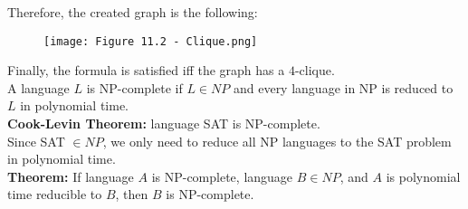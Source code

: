 \documentclass{article}
\begin{document}
Therefore, the created graph is the following:
\begin{figure}[H]
    \centering
    \texttt{[image: Figure 11.2 - Clique.png]}
\end{figure}
Finally, the formula is satisfied iff the graph has a $4$-clique.
\vspace{0.2cm} \\
A language $L$ is NP-complete if $L \in NP$ and every language in NP is reduced to $L$ in polynomial time. 
\vspace{0.2cm} \\
\textbf{Cook-Levin Theorem:} language SAT is NP-complete. \\
Since SAT $\in NP$, we only need to reduce all NP languages to the SAT problem in polynomial time.
\vspace{0.2cm} \\
\textbf{Theorem:} If language $A$ is NP-complete, language $B \in NP$, and $A$ is polynomial time reducible to $B$, then $B$ is NP-complete.
\vspace{0.2cm} \\
\end{document}
